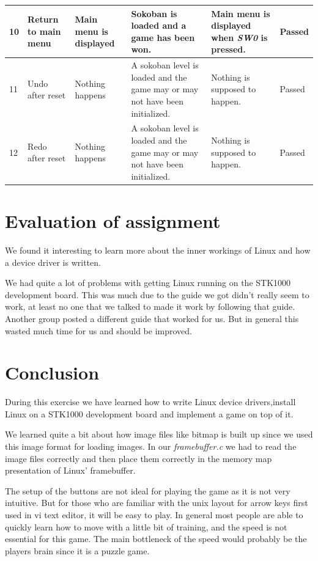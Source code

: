 \documentclass[a4paper,11pt]{article}
\begin{document}
\begin{center}
\begin{tabular}[pos]{|m{35pt}|m{45pt}|m{80pt}|m{90pt}|m{105pt}|m{40pt}|}
\hline 10 & Return to main menu & Main menu is displayed & Sokoban is loaded and a game has been won. & Main menu is displayed when \emph{SW0} is pressed.  & Passed \\

\hline 11 & Undo after reset & Nothing happens & A sokoban level is loaded and the game may or may not have been initialized. & Nothing is supposed to happen.  & Passed \\

\hline 12 & Redo after reset & Nothing happens & A sokoban level is loaded and the game may or may not have been initialized. & Nothing is supposed to happen.  & Passed \\

\hline 
\end{tabular} 
\end{center}

\newpage

\section{Evaluation of assignment}
We found it interesting to learn more about the inner workings of Linux and how a device driver is written. 

We had quite a lot of problems with getting Linux running on the STK1000 development board. This was much due to the guide we got didn't really seem to work, at least no one that we talked to made it work by following that guide. Another group posted a different guide that worked for us. But in general this wasted much time for us and should be improved. 

\section{Conclusion}
During this exercise we have learned how to write Linux device drivers,install Linux on a STK1000 development board and implement a game on top of it. 



We learned quite a bit about how image files like bitmap is built up since we used this image format for loading images. In our \textit{framebuffer.c} we had to read the image files correctly and then place them correctly in the memory map presentation of Linux' framebuffer. 


The setup of the buttons are not ideal for playing the game as it is not very intuitive. But for those who are familiar with the unix layout for arrow keys first used in vi text editor, it will be easy to play. In general most people are able to quickly learn how to move with a little bit of training, and the speed is not essential for this game. The main bottleneck of the speed would probably be the players brain since it is a puzzle game.
\end{document}
